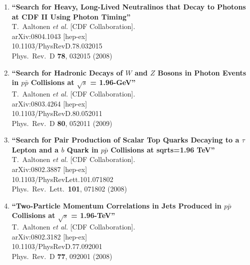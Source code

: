 \documentclass{article}
\begin{document}
\begin{enumerate}
\item%
{\bf ``Search for Heavy, Long-Lived Neutralinos that Decay to Photons at CDF II Using Photon Timing''}
  \\{}T.~Aaltonen {\it et al.}  [CDF Collaboration].
  \\{}arXiv:0804.1043 [hep-ex]
    \\{}10.1103/PhysRevD.78.032015
\\{}Phys.\ Rev.\ D {\bf 78}, 032015 (2008) %


\item%
{\bf ``Search for Hadronic Decays of $W$ and $Z$ Bosons in Photon Events in $p \bar{p}$ Collisions at $\sqrt{s}$ = 1.96-GeV''}
  \\{}T.~Aaltonen {\it et al.}  [CDF Collaboration].
  \\{}arXiv:0803.4264 [hep-ex]
    \\{}10.1103/PhysRevD.80.052011
\\{}Phys.\ Rev.\ D {\bf 80}, 052011 (2009) %



\item%
{\bf ``Search for Pair Production of Scalar Top Quarks Decaying to a $\tau$ Lepton and a $b$ Quark in $p\bar{p}$ Collisions at sqrt{s}=1.96 TeV''}
  \\{}T.~Aaltonen {\it et al.}  [CDF Collaboration].
  \\{}arXiv:0802.3887 [hep-ex]
    \\{}10.1103/PhysRevLett.101.071802
\\{}Phys.\ Rev.\ Lett.\  {\bf 101}, 071802 (2008) %


\item%
{\bf ``Two-Particle Momentum Correlations in Jets Produced in $p\bar{p}$ Collisions at $\sqrt{s}$ = 1.96-TeV''}
  \\{}T.~Aaltonen {\it et al.}  [CDF Collaboration].
  \\{}arXiv:0802.3182 [hep-ex]
    \\{}10.1103/PhysRevD.77.092001
\\{}Phys.\ Rev.\ D {\bf 77}, 092001 (2008) %



\end{enumerate}
\end{document}
